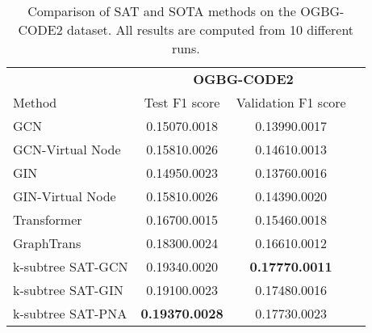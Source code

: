 \begin{table}
  \caption{Comparison of SAT and SOTA methods on the OGBG-CODE2 dataset. All results are computed from 10 different runs.}
  \label{tab:supp_code2}
  \centering
  \begin{sc}
        \begin{tabular}{lccc}
        \toprule
        {}& \multicolumn{2}{c}{\textbf{OGBG-CODE2}} \\
        Method & Test F1 score & Validation F1 score \\
        \midrule
        GCN & 0.15070.0018 & 0.13990.0017 \\
        GCN-Virtual Node & 0.15810.0026 & 0.14610.0013	\\
        GIN & 0.14950.0023 & 0.13760.0016 \\
        GIN-Virtual Node & 0.15810.0026 & 0.14390.0020 \\
        \midrule
        Transformer & 0.16700.0015 &  0.15460.0018 \\
        GraphTrans & 0.18300.0024 & 0.16610.0012 \\
        \midrule
        k-subtree SAT-GCN & 0.19340.0020 & \textbf{0.17770.0011} \\
        k-subtree SAT-GIN & 0.19100.0023 & 0.17480.0016 \\
        k-subtree SAT-PNA & \textbf{0.19370.0028} & 0.17730.0023 \\
        \bottomrule
        \end{tabular}
    \end{sc}
\end{table}


